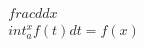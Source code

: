 \documentclass[preview]{standalone}
\begin{document}
\begin{align*}
\quad\\frac{d}{dx} \quad\\int_{a}^{x} f(t) dt = f(x)
\end{align*}
\end{document}
